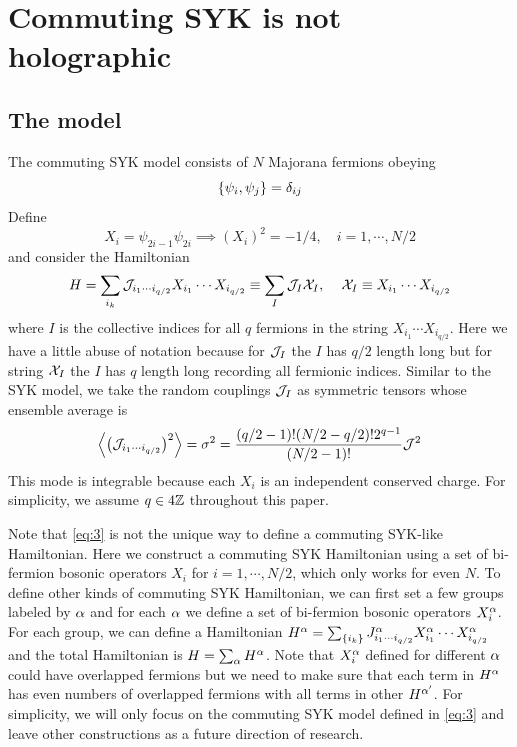 \documentclass[11pt]{article}
\renewcommand{\>}{\rangle}
\newcommand{\<}{\langle}
\begin{document}
\section{Commuting SYK is not holographic} \label{sec2}

\subsection{The model}

The commuting SYK model consists of $N$ Majorana fermions obeying 
\begin{equation}
\{\psi_{i},\psi_{j}\}=\delta_{ij}
\end{equation}
Define
\begin{equation}
X_{i}=\psi_{2i-1}\psi_{2i}\implies(X_{i})^{2}=-1/4,\quad i=1,\cdots,N/2
\end{equation}
and consider the Hamiltonian
\begin{equation}
H=\sum_{i_{k}}\mathcal{J}_{i_{1}\cdots i_{q/2}}X_{i_{1}}\cdots X_{i_{q/2}}\equiv\sum_{I}\mathcal{J}_{I}\mathcal{X}_{I},\quad\,\mathcal{X}_{I}\equiv X_{i_{1}}\cdots X_{i_{q/2}}\label{eq:3}
\end{equation}
where $I$ is the collective indices for all $q$ fermions in the
string $X_{i_{1}}\cdots X_{i_{q/2}}$. Here we have a little abuse
of notation because for $\mathcal{J}_{I}$ the $I$ has $q/2$ length long
but for string $\mathcal{X}_{I}$ the $I$ has $q$ length long recording
all fermionic indices. Similar to the SYK model, we take the random couplings
$\mathcal{J}_{I}$ as symmetric tensors whose ensemble average is 
\begin{equation}
\left\langle \left(\mathcal{J}_{i_{1}\cdots i_{q/2}}\right)^{2}\right\rangle=\sigma^{2}=\frac{(q/2-1)!(N/2-q/2)!2^{q-1}}{(N/2-1)!}\mathcal{J}^{2}\label{eq:4}
\end{equation}
This mode is integrable because each $X_{i}$ is an independent conserved
charge. For simplicity, we assume $q\in4\mathbb{Z}$ throughout this paper. 

Note that \eqref{eq:3} is not the unique way to define a commuting SYK-like Hamiltonian. Here we construct a commuting SYK Hamiltonian using a set
of bi-fermion bosonic operators $X_{i}$ for $i=1,\cdots,N/2$, which only works for even $N$. To define other kinds of
commuting SYK Hamiltonian, we can first set a few groups labeled by
$\alpha$ and for each $\alpha$ we define a set of bi-fermion bosonic
operators $X_{i}^{\alpha}$. For each group, we can define a Hamiltonian
$H^{\alpha}=\sum_{\{i_{k}\}}J_{i_{1}\cdots i_{q/2}}^{\alpha}X_{i_{1}}^{\alpha}\cdots X_{i_{q/2}}^{\alpha}$
and the total Hamiltonian is $H=\sum_{\alpha}H^{\alpha}$. Note that $X_{i}^{\alpha}$
defined for different $\alpha$ could have overlapped fermions but we
need to make sure that each term in $H^{\alpha}$ has even numbers of
overlapped fermions with all terms in other $H^{\alpha'}$. For simplicity, we will only focus on the commuting SYK model defined in \eqref{eq:3} and leave other constructions as a future direction of research.
\end{document}

